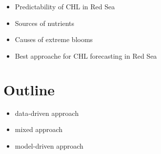 	\begin{itemize}
		\item Predictability of CHL in Red Sea
		\item Sources of nutrients
		\item Causes of extreme blooms
		\item Best approache for CHL forecasting in Red Sea
	\end{itemize}

\section{Outline}
\label{intro:outline}

	\begin{itemize}
		\item data-driven approach
		\item mixed approach
		\item model-driven approach
	\end{itemize}
